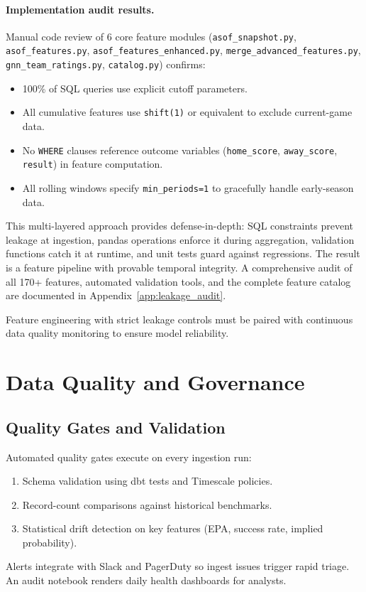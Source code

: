 \paragraph{Implementation audit results.}
Manual code review of 6 core feature modules (\texttt{asof\_snapshot.py}, \texttt{asof\_features.py}, \texttt{asof\_features\_enhanced.py}, \texttt{merge\_advanced\_features.py}, \texttt{gnn\_team\_ratings.py}, \texttt{catalog.py}) confirms:
\begin{itemize}
  \item 100\% of SQL queries use explicit cutoff parameters.
  \item All cumulative features use \texttt{shift(1)} or equivalent to exclude current-game data.
  \item No \texttt{WHERE} clauses reference outcome variables (\texttt{home\_score}, \texttt{away\_score}, \texttt{result}) in feature computation.
  \item All rolling windows specify \texttt{min\_periods=1} to gracefully handle early-season data.
\end{itemize}

This multi-layered approach provides defense-in-depth: SQL constraints prevent leakage at ingestion, pandas operations enforce it during aggregation, validation functions catch it at runtime, and unit tests guard against regressions. The result is a feature pipeline with provable temporal integrity. A comprehensive audit of all 170+ features, automated validation tools, and the complete feature catalog are documented in Appendix~\ref{app:leakage_audit}.

Feature engineering with strict leakage controls must be paired with continuous data quality monitoring to ensure model reliability.

\section{Data Quality and Governance}
\label{sec:data-quality}

\subsection{Quality Gates and Validation}
Automated quality gates execute on every ingestion run:
\begin{enumerate}
  \item Schema validation using dbt tests and Timescale policies.
  \item Record-count comparisons against historical benchmarks.
  \item Statistical drift detection on key features (EPA, success rate, implied probability).
\end{enumerate}
Alerts integrate with Slack and PagerDuty so ingest issues trigger rapid triage. An audit notebook renders daily health dashboards for analysts.

